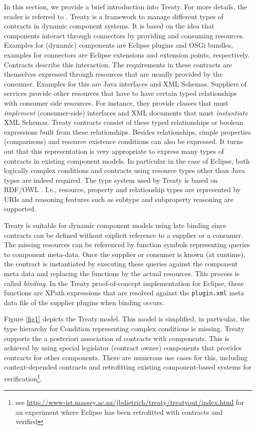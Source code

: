 \documentclass{llncs}
\begin{document}
In this section, we provide a brief introduction into Treaty. For more details, the reader is referred to \cite{Treaty.JOT2009}. Treaty is a framework to manage different types of contracts in dynamic component systems. It is based on the idea 
that components interact through connectors by providing and consuming resources. Examples for (dynamic) components are Eclipse plugins and OSGi bundles, examples for connectors are Eclipse extensions and extension points, respectively. Contracts describe this interaction. The requirements in these contracts are themselves expressed through resources that are usually provided by the consumer. Examples for this
are Java interfaces and XML Schemas. Suppliers of services provide other resources that have to have certain typed relationships with consumer side resources. For instance, they provide classes that must \textit{implement} (consumer-side) 
interfaces and XML documents that must \textit{instantiate} XML Schemas. Treaty contracts consist of these typed relationships or boolean expressions built from these relationships. Besides relationships, simple properties (comparisons) and 
resource existence conditions can also be expressed. It turns out that this representation is very appropriate to express many types of contracts in existing component models. In particular in the case of Eclipse,  both logically complex conditions and contracts using resource types other than Java types are indeed required. The type system used by Treaty is based on RDF/OWL \cite{RDF,OWL}. I.e., resource, property and relationship types are represented by URIs and reasoning features such as subtype and subproperty reasoning are supported. 

Treaty is suitable for dynamic component models using late binding since contracts can be defined without explicit reference to a supplier or a consumer. The missing resources can be referenced by function symbols representing 
queries to component meta-data. Once the supplier or consumer is known (at runtime), the contract is instantiated by executing these queries against the component meta data and replacing the functions by the actual resources. 
This process is called \textit{binding}. In the Treaty proof-of-concept implementation for Eclipse, these functions are XPath expressions that are resolved against the \texttt{plugin.xml} meta data file of the supplier plugins when 
binding occurs. 

Figure \ref{fig1} depicts the Treaty model. This model is simplified, in particular, the type hierarchy for Condition representing complex conditions is missing. Treaty supports the a posteriori association of contracts with components. 
This is achieved by using special legislator (contract owner) components that provides contracts for other components.  There are numerous use cases for this, including context-depended contracts and retrofitting existing component-based systems for verification\footnote{see \url{http://www-ist.massey.ac.nz/jbdietrich/treaty/treatyout/index.html} for an experiment where Eclipse has been retrofitted with contracts and verified}.   
 
\end{document}
